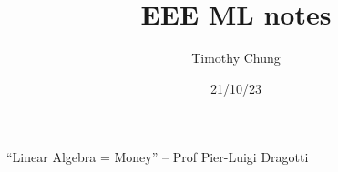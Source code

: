 \documentclass{report}
\title{EEE ML notes}
\author{Timothy Chung}
\date{21/10/23}
\begin{document}
% 

\tableofcontents
\newpage

{\Large ``Linear Algebra = Money'' – Prof Pier-Luigi Dragotti }




\end{document}
